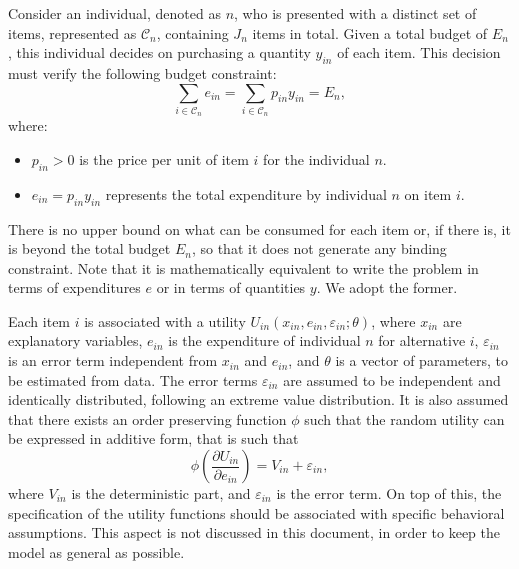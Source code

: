 \documentclass[12pt,a4paper]{article}
\begin{document}
Consider an individual, denoted as $n$, who is presented with a
distinct set of items, represented as $\mathcal{C}_n$, containing
$J_n$ items in total. Given a total budget of $E_n$, this individual
decides on purchasing a quantity $y_{in}$ of each item. This decision
must verify the following budget constraint:
\[
\sum_{i \in \mathcal{C}_n} e_{in} = \sum_{i \in \mathcal{C}_n} p_{in} y_{in} = E_n,
\]
where:
\begin{itemize}
    \item $p_{in} > 0$ is the price per unit of item $i$ for the individual $n$.
    \item $e_{in} = p_{in} y_{in}$ represents the total expenditure by individual $n$ on item $i$.
\end{itemize}
There is no upper bound on what can be consumed for each item or, if there is, it is beyond the total budget $E_n$, so that
it does not generate any binding constraint.
Note that it is mathematically equivalent
to write the problem in terms of expenditures $e$ or in terms of quantities $y$. We adopt the former.


Each item $i$ is associated with a utility $U_{in}(x_{in}, e_{in}, \varepsilon_{in}; \theta)$, where $x_{in}$ are explanatory variables,
$e_{in}$ is the expenditure of individual $n$ for alternative $i$, $\varepsilon_{in}$ is an error term independent from $x_{in}$ and $e_{in}$, and $\theta$ is a vector of parameters, to be estimated from data.
The error terms $\varepsilon_{in}$ are assumed to be independent and identically distributed, following an extreme value distribution.
It is also assumed that there exists an order preserving function $\phi$ such that the random utility can be expressed in additive form, that is such that
\begin{equation}
    \label{eq:phi}
\phi\left(\frac{\partial U_{in}}{\partial e_{in}}\right) = V_{in} + \varepsilon_{in},
\end{equation}
where $V_{in}$ is the deterministic part, and $\varepsilon_{in}$ is the error term.
On
top of this, the specification of the utility functions should be
associated with specific behavioral assumptions. This aspect is not discussed in this document, in order to keep the model as general as possible. 
\end{document}
